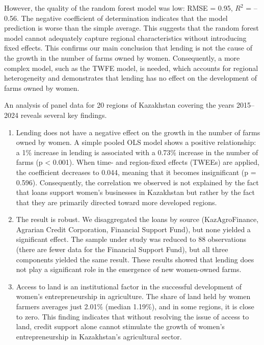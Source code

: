 ﻿\documentclass[pdflatex,sn-mathphys-ay]{sn-jnl}
\begin{document}
However, the quality of the random forest model was low: RMSE = 0.95, $R^2$
= --0.56. The negative coefficient of determination indicates that the
model prediction is worse than the simple average. This suggests that the
random forest model cannot adequately capture regional characteristics
without introducing fixed effects. This confirms our main conclusion
that lending is not the cause of the growth in the number of farms owned
by women. Consequently, a more complex model, such
as the TWFE model, is needed, which accounts for regional heterogeneity
and demonstrates that lending has no effect on the development of farms
owned by women.

An analysis of panel data for 20 regions of Kazakhstan covering the
years 2015--2024 reveals several key findings.

\begin{enumerate}
\item Lending does not have a negative effect on the growth in the number
of farms owned by women. A simple pooled OLS model shows a positive
relationship: a 1\% increase in lending is associated with a 0.73\%
increase in the number of farms (p \textless{} 0.001). When time- and
region-fixed effects (TWEEs) are applied, the coefficient decreases to
0.044, meaning that it becomes insignificant (p = 0.596). Consequently,
the correlation we observed is not explained by the fact that loans
support women's businesses in Kazakhstan but rather by the fact that they are
primarily directed toward more developed regions.

\item The result is robust. We disaggregated the loans by source
(KazAgroFinance, Agrarian Credit Corporation, Financial Support Fund),
but none yielded a significant effect. The sample under study was
reduced to 88 observations (there are fewer data for the Financial Support
Fund), but all three components yielded the same result. These results
showed that lending does not play a significant role in the emergence of
new women-owned farms.

\item Access to land is an institutional factor in the successful
development of women's entrepreneurship in agriculture. The share of
land held by women farmers averages just 2.01\% (median 1.19\%), and in
some regions, it is close to zero. This finding indicates that without
resolving the issue of access to land, credit support alone cannot
stimulate the growth of women's entrepreneurship in Kazakhstan's
agricultural sector.


\end{enumerate}
\end{document}
